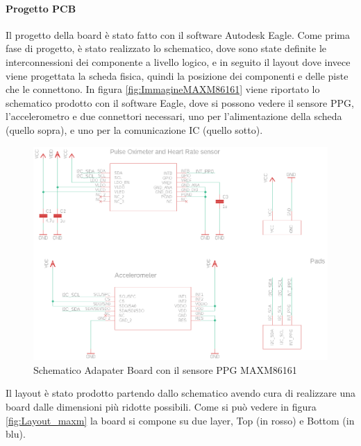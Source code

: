 \cite{STElectronicsLIS2DW12}






\paragraph{Progetto PCB} Il progetto della board è stato fatto con il software Autodesk Eagle. Come prima fase di progetto, è stato realizzato lo schematico, dove sono state definite le interconnessioni dei componente a livello logico, e in seguito il layout dove invece viene progettata la scheda fisica, quindi la posizione dei componenti e delle piste che le connettono.
In figura \ref{fig:ImmagineMAXM86161} viene riportato lo schematico prodotto con il software Eagle, dove si possono vedere il sensore PPG, l'accelerometro e due connettori necessari, uno per l'alimentazione della scheda (quello sopra), e uno per la comunicazione IC (quello sotto).
\begin{figure}[h]
	\centering
	\includegraphics[width=0.8\linewidth]{ImageFiles/Hardware/schematic_maxm}
	\caption{Schematico Adapater Board con il sensore PPG MAXM86161}
	\label{fig:schematic_maxm}
\end{figure}
Il layout è stato prodotto partendo dallo schematico avendo cura di realizzare una board dalle dimensioni più ridotte possibili. Come si può vedere in figura \ref{fig:Layout_maxm} la board si compone su due layer, Top (in rosso) e Bottom (in blu).
